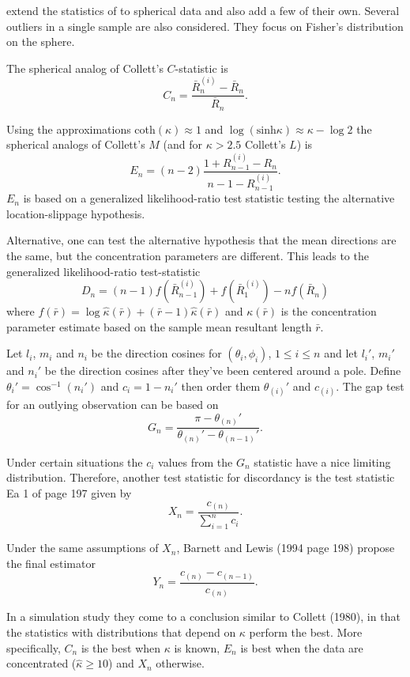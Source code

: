 \documentclass{article}\usepackage[]{graphicx}\usepackage[]{color}
\begin{document}
\cite{fisher1981} extend the statistics of \cite{collett1980} to spherical data and also add a few of their own.  Several outliers in a single sample are also considered.  They focus on Fisher's distribution on the sphere.

The spherical analog of Collett's $C$-statistic is
\[
C_n=\frac{\bar{R}_n^{(i)}-\bar{R}_n}{\bar{R}_n}.
\]

Using the approximations coth$(\kappa)\approx 1$ and $\log(\text{sinh}\kappa)\approx\kappa-\log 2$ the spherical analogs of Collett's $M$ (and for $\kappa>2.5$ Collett's $L$) is 
\[
E_n=(n-2)\frac{1+R_{n-1}^{(i)}-R_n}{n-1-R_{n-1}^{(i)}}.
\]
$E_n$ is based on a generalized likelihood-ratio test statistic testing the alternative location-slippage hypothesis.

Alternative, one can test the alternative hypothesis that the mean directions are the same, but the concentration parameters are different.  This leads to the generalized likelihood-ratio test-statistic
\[
D_n=(n-1)f(\bar{R}_{n-1}^{(i)})+f(\bar{R}_1^{(i)})-nf(\bar{R}_n)
\]
where $f(\bar{r})=\log\hat\kappa(\bar{r})+(\bar{r}-1)\hat\kappa(\bar{r})$ and $\kappa(\bar{r})$ is the concentration parameter estimate based on the sample mean resultant length $\bar{r}$.

Let $l_i$, $m_i$ and $n_i$ be the direction cosines for $(\theta_i,\phi_i)$, $1\leq i\leq n$ and let $l_i'$, $m_i'$ and $n_i'$ be the direction cosines after they've been centered around a pole.  Define $\theta_i'=\cos^{-1}(n_i')$ and $c_i=1-n_i'$ then order them $\theta_{(i)}'$ and $c_{(i)}$.  The gap test for an outlying observation can be based on
\[
G_n=\frac{\pi-\theta_{(n)}'}{\theta_{(n)}'-\theta_{(n-1)}'}.
\]

Under certain situations the $c_i$ values from the $G_n$ statistic have a nice limiting distribution.  Therefore, another test statistic for discordancy is the test statistic Ea 1 of  page 197 \cite{barnett1994} given by
\[
X_n=\frac{c_{(n)}}{\sum_{i=1}^nc_i}.
\]

Under the same assumptions of $X_n$, Barnett and Lewis (1994 page 198) propose the final estimator
\[
Y_n=\frac{c_{(n)}-c_{(n-1)}}{c_{(n)}}.
\]

In a simulation study they come to a conclusion similar to Collett (1980), in that the statistics with distributions that depend on $\kappa$ perform the best.  More specifically, $C_n$ is the best when $\kappa$ is known, $E_n$ is best when the data are concentrated ($\hat{\kappa}\geq 10$) and $X_n$ otherwise.
\end{document}
